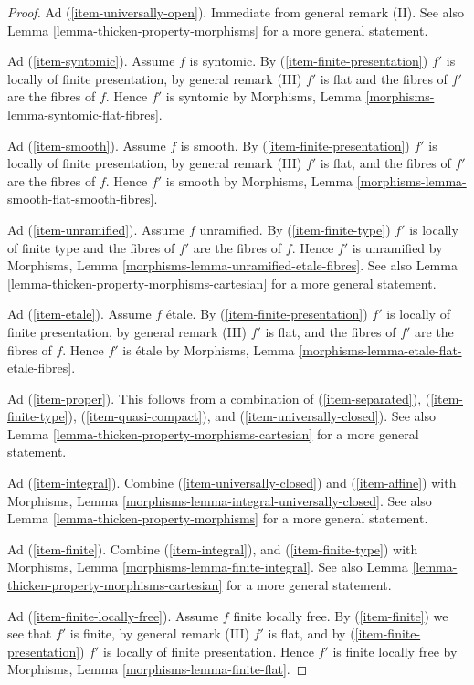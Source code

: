 \begin{proof}
\medskip\noindent
Ad (\ref{item-universally-open}). Immediate from general remark (II). See also
Lemma \ref{lemma-thicken-property-morphisms} for a more general statement.

\medskip\noindent
Ad (\ref{item-syntomic}). Assume $f$ is syntomic. By
(\ref{item-finite-presentation}) $f'$ is locally of finite presentation,
by general remark (III) $f'$ is flat and the fibres of $f'$ are the fibres
of $f$. Hence $f'$ is syntomic by
Morphisms, Lemma \ref{morphisms-lemma-syntomic-flat-fibres}.

\medskip\noindent
Ad (\ref{item-smooth}). Assume $f$ is smooth. By
(\ref{item-finite-presentation}) $f'$ is locally of finite presentation,
by general remark (III) $f'$ is flat, and the fibres of $f'$ are the
fibres of $f$. Hence $f'$ is smooth by
Morphisms, Lemma \ref{morphisms-lemma-smooth-flat-smooth-fibres}.

\medskip\noindent
Ad (\ref{item-unramified}). Assume $f$ unramified. By
(\ref{item-finite-type}) $f'$ is locally of finite type
and the fibres of $f'$ are the fibres of $f$.
Hence $f'$ is unramified by
Morphisms, Lemma \ref{morphisms-lemma-unramified-etale-fibres}. See also
Lemma \ref{lemma-thicken-property-morphisms-cartesian}
for a more general statement.

\medskip\noindent
Ad (\ref{item-etale}). Assume $f$ \'etale. By
(\ref{item-finite-presentation}) $f'$ is locally of finite presentation,
by general remark (III) $f'$ is flat, and the fibres of $f'$ are the fibres
of $f$. Hence $f'$ is \'etale by
Morphisms, Lemma \ref{morphisms-lemma-etale-flat-etale-fibres}.

\medskip\noindent
Ad (\ref{item-proper}). This follows from a combination of
(\ref{item-separated}), (\ref{item-finite-type}), (\ref{item-quasi-compact}),
and (\ref{item-universally-closed}).  See also
Lemma \ref{lemma-thicken-property-morphisms-cartesian}
for a more general statement.

\medskip\noindent
Ad (\ref{item-integral}). Combine (\ref{item-universally-closed}) and
(\ref{item-affine}) with
Morphisms, Lemma \ref{morphisms-lemma-integral-universally-closed}. See also
Lemma \ref{lemma-thicken-property-morphisms} for a more general statement.

\medskip\noindent
Ad (\ref{item-finite}). Combine (\ref{item-integral}),
and (\ref{item-finite-type}) with
Morphisms, Lemma \ref{morphisms-lemma-finite-integral}. See also
Lemma \ref{lemma-thicken-property-morphisms-cartesian}
for a more general statement.

\medskip\noindent
Ad (\ref{item-finite-locally-free}). Assume $f$ finite locally free. By
(\ref{item-finite}) we see that $f'$ is finite, by general remark (III)
$f'$ is flat, and by (\ref{item-finite-presentation}) $f'$ is locally of finite
presentation. Hence $f'$ is finite locally free by
Morphisms, Lemma \ref{morphisms-lemma-finite-flat}.
\end{proof}

